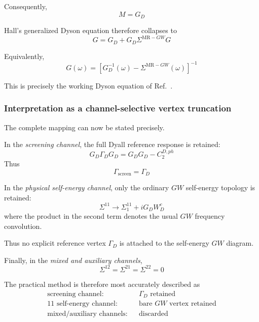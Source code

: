 \documentclass[aip,jcp,reprint,noshowkeys,superscriptaddress]{revtex4-1}
\begin{document}
Consequently,
\begin{equation}
  M
  =
  G_D
\end{equation}

Hall's generalized Dyson equation therefore collapses to
\begin{equation}
  G
  =
  G_D
  +
  G_D
  \Sigma^{\mathrm{MR-}GW}
  G
  \label{eq:MRGW-Dyson-task3}
\end{equation}

Equivalently,
\begin{equation}
  G(\omega)
  =
  \left[
    G_D^{-1}(\omega)
    -
    \Sigma^{\mathrm{MR-}GW}(\omega)
  \right]^{-1}
  \label{eq:MRGW-inverse-task3}
\end{equation}

This is precisely the working Dyson equation of
Ref.~\cite{WangFangLi2026}.


\subsubsection{Interpretation as a channel-selective vertex truncation}

The complete mapping can now be stated precisely.

In the \emph{screening channel}, the full Dyall reference response is
retained:
\begin{equation}
  G_D\Gamma_DG_D
  =
  G_DG_D-C_2^{D,ph}
\end{equation}
Thus
\begin{equation}
  \Gamma_{\mathrm{screen}}
  =
  \Gamma_D
  \label{eq:Gamma-screen}
\end{equation}

In the \emph{physical self-energy channel}, only the ordinary $GW$
self-energy topology is retained:
\begin{equation}
  \Sigma^{11}
  \longrightarrow
  \Sigma_1^{11}
  +
  iG_DW_D^c
  \label{eq:Gamma-sigma11}
\end{equation}
where the product in the second term denotes the usual $GW$
frequency convolution.

Thus no explicit reference vertex $\Gamma_D$ is attached to the
self-energy $GW$ diagram.

Finally, in the \emph{mixed and auxiliary channels},
\begin{equation}
  \Sigma^{12}
  =
  \Sigma^{21}
  =
  \Sigma^{22}
  =
  0
  \label{eq:mixed-aux-truncation}
\end{equation}

The practical method is therefore most accurately described as
\begin{equation}
  \begin{array}{rcl}
  \text{screening channel:}
  &&
  \Gamma_D
  \text{ retained}
  \\[1mm]
  \text{$11$ self-energy channel:}
  &&
  \text{bare $GW$ vertex retained}
  \\[1mm]
  \text{mixed/auxiliary channels:}
  &&
  \text{discarded}
  \end{array}
  \label{eq:channel-selective-summary}
\end{equation}
\end{document}
